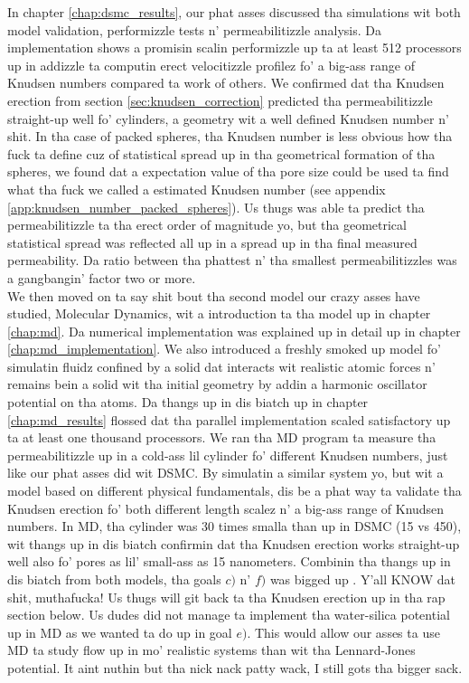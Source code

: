 In chapter \ref{chap:dsmc_results}, our phat asses discussed tha simulations wit both model validation, performizzle tests n' permeabilitizzle analysis. Da implementation shows a promisin scalin performizzle up ta at least 512 processors up in addizzle ta computin erect velocitizzle profilez fo' a big-ass range of Knudsen numbers compared ta work of others. We confirmed dat tha Knudsen erection from section \ref{sec:knudsen_correction} predicted tha permeabilitizzle straight-up well fo' cylinders, a geometry wit a well defined Knudsen number n' shit. In tha case of packed spheres, tha Knudsen number is less obvious how tha fuck ta define cuz of statistical spread up in tha geometrical formation of tha spheres, we found dat a expectation value of tha pore size could be used ta find what tha fuck we called a estimated Knudsen number (see appendix \ref{app:knudsen_number_packed_spheres}). Us thugs was able ta predict tha permeabilitizzle ta tha erect order of magnitude yo, but tha geometrical statistical spread was reflected all up in a spread up in tha final measured permeability. Da ratio between tha phattest n' tha smallest permeabilitizzles was a gangbangin' factor two or more.\\
We then moved on ta say shit bout tha second model our crazy asses have studied, Molecular Dynamics, wit a introduction ta tha model up in chapter \ref{chap:md}. Da numerical implementation was explained up in detail up in chapter \ref{chap:md_implementation}. We also introduced a freshly smoked up model fo' simulatin fluidz confined by a solid dat interacts wit realistic atomic forces n' remains bein a solid wit tha initial geometry by addin a harmonic oscillator potential on tha atoms. Da thangs up in dis biatch up in chapter \ref{chap:md_results} flossed dat tha parallel implementation scaled satisfactory up ta at least one thousand processors. We ran tha MD program ta measure tha permeabilitizzle up in a cold-ass lil cylinder fo' different Knudsen numbers, just like our phat asses did wit DSMC. By simulatin a similar system yo, but wit a model based on different physical fundamentals, dis be a phat way ta validate tha Knudsen erection fo' both different length scalez n' a big-ass range of Knudsen numbers. In MD, tha cylinder was 30 times smalla than up in DSMC (\unit{15}{\nano\meter} vs \unit{450}{\nano\meter}), wit thangs up in dis biatch confirmin dat tha Knudsen erection works straight-up well also fo' pores as lil' small-ass as 15 nanometers. Combinin tha thangs up in dis biatch from both models, tha goals $c)$ n' $f)$ was  bigged up . Y'all KNOW dat shit, muthafucka! Us thugs will git back ta tha Knudsen erection up in tha rap section below. Us dudes did not manage ta implement tha water-silica potential up in MD as we wanted ta do up in goal $e)$. This would allow our asses ta use MD ta study flow up in mo' realistic systems than wit tha Lennard-Jones potential. It aint nuthin but tha nick nack patty wack, I still gots tha bigger sack. 
